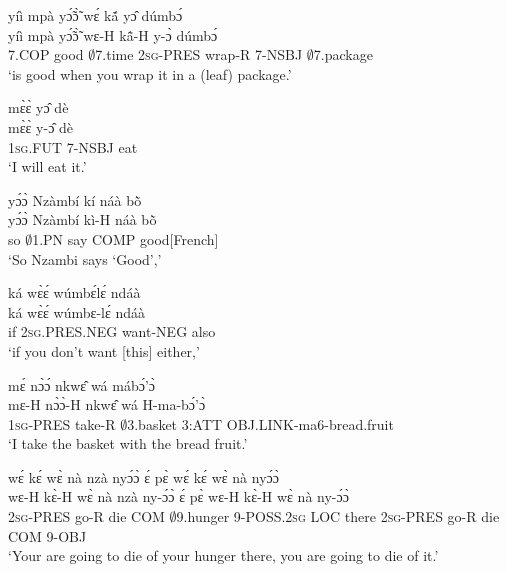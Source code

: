 \begin{exe} 
\exN\label{75}
  \glll yíì mpà yɔ̃́ɔ̃̀ wɛ́ kã́ yɔ̂ dúmbɔ́ \\
       yíì mpà yɔ̃́ɔ̃̀ wɛ-H kã̂-H y-ɔ̀ dúmbɔ́ \\
         7.COP good $\emptyset$7.time 2\textsc{sg}-PRES wrap-R 7-NSBJ $\emptyset$7.package\\ 
    \trans `is good when you wrap it in a (leaf) package.'
\end{exe}

\begin{exe} 
\exN\label{76}
  \glll mɛ̀ɛ̀ yɔ̂ dè \\
         mɛ̀ɛ̀ y-ɔ̂ dè \\
        1\textsc{sg}.FUT 7-NSBJ eat  \\
    \trans `I will eat it.'
\end{exe}

\begin{exe} 
\exN\label{77}
  \glll yɔ́ɔ̀ Nzàmbí kí náà bõ̀ \\
       yɔ́ɔ̀ Nzàmbí kì-H náà bõ̀ \\
          so $\emptyset$1.PN say COMP good[French]  \\
    \trans `So Nzambi says `Good','
\end{exe}

\begin{exe} 
\exN\label{78}
  \glll ká wɛ̀ɛ́ wúmbɛ́lɛ́ ndáà \\
        ká wɛ̀ɛ́ wúmbɛ-lɛ́ ndáà \\
         if 2\textsc{sg}.PRES.NEG want-NEG also   \\
    \trans `if you don't want [this] either,'
\end{exe}

\begin{exe} 
\exN\label{79}
  \glll mɛ́ nɔ̀ɔ́ nkwɛ̂ wá mábɔ́'ɔ̀ \\
        mɛ-H nɔ̀ɔ̀-H nkwɛ̂ wá H-ma-bɔ́'ɔ̀ \\
         1\textsc{sg}-PRES take-R $\emptyset$3.basket 3:ATT OBJ.LINK-ma6-bread.fruit\\
    \trans `I take the basket with the bread fruit.'
\end{exe}

\begin{exe} 
\exN\label{80}
  \glll wɛ́ kɛ́ wɛ̀ nà nzà nyɔ́ɔ̀ ɛ́ pɛ̀ wɛ́ kɛ́ wɛ̀ nà nyɔ́ɔ̀ \\
       wɛ-H kɛ̀-H wɛ̀ nà nzà ny-ɔ́ɔ̀ ɛ́ pɛ̀ wɛ-H kɛ̀-H wɛ̀ nà ny-ɔ́ɔ̀ \\
        2\textsc{sg}-PRES go-R die COM  $\emptyset$9.hunger 9-POSS.2\textsc{sg} LOC there 2\textsc{sg}-PRES go-R die COM 9-OBJ\\
    \trans `Your are going to die of your hunger there, you are going to die of it.'
\end{exe}

